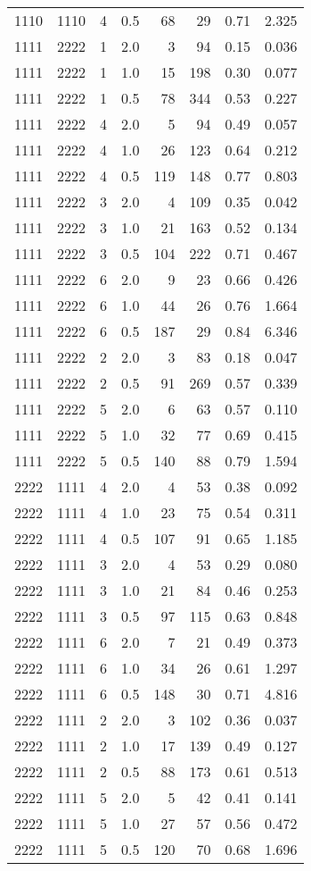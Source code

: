 \documentclass[11pt]{svjour3} \usepackage{fullpage}
\begin{document}
{\begin{tabular}[t]{@{}|c@{~~}c@{~~}c@{~}c@{~}r@{~}r@{~}c@{~}c|}
\\ 1110 & 1110 & 4 & 0.5 & 68 & 29 & 0.71 & 2.325
\\ 1111 & 2222 & 1 & 2.0 & 3 & 94 & 0.15 & 0.036
\\ 1111 & 2222 & 1 & 1.0 & 15 & 198 & 0.30 & 0.077
\\ 1111 & 2222 & 1 & 0.5 & 78 & 344 & 0.53 & 0.227
\\ 1111 & 2222 & 4 & 2.0 & 5 & 94 & 0.49 & 0.057
\\ 1111 & 2222 & 4 & 1.0 & 26 & 123 & 0.64 & 0.212
\\ 1111 & 2222 & 4 & 0.5 & 119 & 148 & 0.77 & 0.803
\\ 1111 & 2222 & 3 & 2.0 & 4 & 109 & 0.35 & 0.042
\\ 1111 & 2222 & 3 & 1.0 & 21 & 163 & 0.52 & 0.134
\\ 1111 & 2222 & 3 & 0.5 & 104 & 222 & 0.71 & 0.467
\\ 1111 & 2222 & 6 & 2.0 & 9 & 23 & 0.66 & 0.426
\\ 1111 & 2222 & 6 & 1.0 & 44 & 26 & 0.76 & 1.664
\\ 1111 & 2222 & 6 & 0.5 & 187 & 29 & 0.84 & 6.346
\\ 1111 & 2222 & 2 & 2.0 & 3 & 83 & 0.18 & 0.047
\\ 1111 & 2222 & 2 & 0.5 & 91 & 269 & 0.57 & 0.339
\\ 1111 & 2222 & 5 & 2.0 & 6 & 63 & 0.57 & 0.110
\\ 1111 & 2222 & 5 & 1.0 & 32 & 77 & 0.69 & 0.415
\\ 1111 & 2222 & 5 & 0.5 & 140 & 88 & 0.79 & 1.594
\\ 2222 & 1111 & 4 & 2.0 & 4 & 53 & 0.38 & 0.092
\\ 2222 & 1111 & 4 & 1.0 & 23 & 75 & 0.54 & 0.311
\\ 2222 & 1111 & 4 & 0.5 & 107 & 91 & 0.65 & 1.185
\\ 2222 & 1111 & 3 & 2.0 & 4 & 53 & 0.29 & 0.080
\\ 2222 & 1111 & 3 & 1.0 & 21 & 84 & 0.46 & 0.253
\\ 2222 & 1111 & 3 & 0.5 & 97 & 115 & 0.63 & 0.848
\\ 2222 & 1111 & 6 & 2.0 & 7 & 21 & 0.49 & 0.373
\\ 2222 & 1111 & 6 & 1.0 & 34 & 26 & 0.61 & 1.297
\\ 2222 & 1111 & 6 & 0.5 & 148 & 30 & 0.71 & 4.816
\\ 2222 & 1111 & 2 & 2.0 & 3 & 102 & 0.36 & 0.037
\\ 2222 & 1111 & 2 & 1.0 & 17 & 139 & 0.49 & 0.127
\\ 2222 & 1111 & 2 & 0.5 & 88 & 173 & 0.61 & 0.513
\\ 2222 & 1111 & 5 & 2.0 & 5 & 42 & 0.41 & 0.141
\\ 2222 & 1111 & 5 & 1.0 & 27 & 57 & 0.56 & 0.472
\\ 2222 & 1111 & 5 & 0.5 & 120 & 70 & 0.68 & 1.696
\\ \hline
\end{tabular}

}
\end{document}
